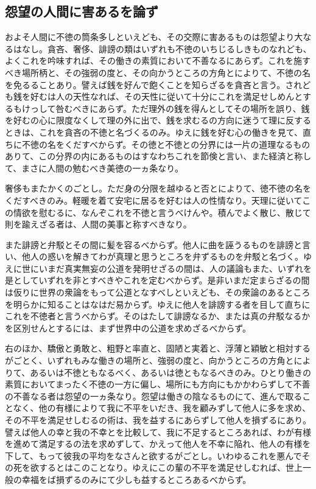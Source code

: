 \documentclass[a4paper, platex, dvipdfmx]{jsarticle}
\begin{document}
\subsection{怨望の人間に害あるを論ず}
およそ人間に不徳の筒条多しといえども、その交際に害あるものは怨望より大なるはなし。貪吝、奢侈、誹謗の類はいずれも不徳のいちじるしきものなれども、よくこれを吟味すれば、その働きの素質において不善なるにあらず。これを施すべき場所柄と、その強弱の度と、その向かうところの方角とによりて、不徳の名を免るることあり。譬えば銭を好んで飽くことを知らざるを貪吝と言う。されども銭を好むは人の天性なれば、その天性に従いて十分にこれを満足せしめんとするもけっして咎むべきにあらず。ただ理外の銭を得んとしてその場所を誤り、銭を好むの心に限度なくして理の外に出で、銭を求むるの方向に迷うて理に反するときは、これを貪吝の不徳と名づくるのみ。ゆえに銭を好む心の働きを見て、直ちに不徳の名をくだすべからず。その徳と不徳との分界には一片の道理なるものありて、この分界の内にあるものはすなわちこれを節倹と言い、また経済と称して、まさに人間の勉むべき美徳の一ヵ条なり。

奢侈もまたかくのごとし。ただ身の分限を越ゆると否とによりて、徳不徳の名をくだすべきのみ。軽暖を着て安宅に居るを好むは人の性情なり。天理に従いてこの情欲を慰むるに、なんぞこれを不徳と言うべけんや。積んでよく散じ、散じて則を踰えざる者は、人間の美事と称すべきなり。

また誹謗と弁駁とその間に髪を容るべからず。他人に曲を誣うるものを誹謗と言い、他人の惑いを解きてわが真理と思うところを弁ずるものを弁駁と名づく。ゆえに世にいまだ真実無妄の公道を発明せざるの間は、人の議論もまた、いずれを是としていずれを非とすべきやこれを定むべからず。是非いまだ定まらざるの間は仮りに世界の衆論をもって公道となすべしといえども、その衆論のあるところを明らかに知ることはなはだ易からず。ゆえに他人を誹謗する者を目して直ちにこれを不徳者と言うべからず。そのはたして誹謗なるか、または真の弁駁なるかを区別せんとするには、まず世界中の公道を求めざるべからず。

右のほか、驕傲と勇敢と、粗野と率直と、固陋と実着と、浮薄と穎敏と相対するがごとく、いずれもみな働きの場所と、強弱の度と、向かうところの方角とによりて、あるいは不徳ともなるべく、あるいは徳ともなるべきのみ。ひとり働きの素質においてまったく不徳の一方に偏し、場所にも方向にもかかわらずして不善の不善なる者は怨望の一ヵ条なり。怨望は働きの陰なるものにて、進んで取ることなく、他の有様によりて我に不平をいだき、我を顧みずして他人に多を求め、その不平を満足せしむるの術は、我を益するにあらずして他人を損ずるにあり。譬えば他人の幸と我の不幸とを比較して、我に不足するところあれば、わが有様を進めて満足するの法を求めずして、かえって他人を不幸に陥れ、他人の有様を下して、もって彼我の平均をなさんと欲するがごとし。いわゆるこれを悪んでその死を欲するとはこのことなり。ゆえにこの輩の不平を満足せしむれば、世上一般の幸福をば損ずるのみにて少しも益するところあるべからず。
\end{document}
